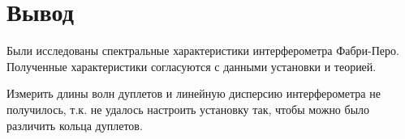 \section{Вывод}
Были исследованы спектральные характеристики интерферометра Фабри-Перо. Полученные характеристики согласуются с данными установки и теорией.

Измерить длины волн дуплетов и линейную дисперсию интерферометра не получилось, т.к. не удалось настроить установку так, чтобы можно было различить кольца дуплетов.
